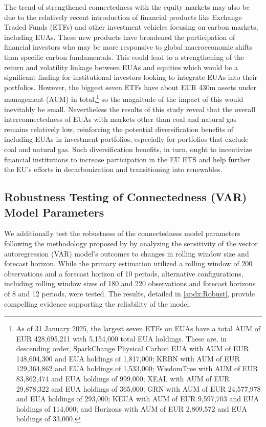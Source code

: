 \documentclass[preprint, 3p,
authoryear]{elsarticle} %
\begin{document}
The trend of strengthened connectedness with the equity markets may also
be due to the relatively recent introduction of financial products like
Exchange Traded Funds (ETFs) and other investment vehicles focusing on
carbon markets, including EUAs. These new products have broadened the
participation of financial investors who may be more responsive to
global macroeconomic shifts than specific carbon fundamentals. This
could lead to a strengthening of the return and volatility linkage
between EUAs and equities which would be a significant finding for
institutional investors looking to integrate EUAs into their portfolios.
However, the biggest seven ETFs have about EUR 430m assets under
management (AUM) in
total,\footnote{As of 31 January 2025, the largest seven ETFs on EUAs have a total AUM of EUR 428,695,211 with 5,154,000 total EUA holdings. These are, in descending order, SparkChange Physical Carbon EUA with AUM of EUR 148,604,300 and EUA holdings of 1,817,000; KRBN with AUM of EUR 129,364,862 and EUA holdings of 1,533,000; WisdomTree with AUM of EUR 83,862,474 and EUA holdings of 999,000; XEAL with AUM of EUR 29,878,322 and EUA holdings of 365,000; GRN with AUM of EUR 24,577,978 and EUA holdings of 293,000; KEUA with AUM of EUR 9,597,703 and EUA holdings of 114,000; and Horizons with AUM of EUR 2,809,572 and EUA holdings of 33,000.}
so the magnitude of the impact of this would inevitably be small.
Nevertheless the results of this study reveal that the overall
interconnectedness of EUAs with markets other than coal and natural gas
remains relatively low, reinforcing the potential diversification
benefits of including EUAs in investment portfolios, especially for
portfolios that exclude coal and natural gas. Such diversification
benefits, in turn, ought to incentivize financial institutions to
increase participation in the EU ETS and help further the EU's efforts
in decarbonization and transitioning into renewables.

\hypertarget{robustness-testing-of-connectedness-var-model-parameters}{%
\subsection{Robustness Testing of Connectedness (VAR) Model
Parameters}\label{robustness-testing-of-connectedness-var-model-parameters}}

We additionally test the robustness of the connectedness model
parameters following the methodology proposed by
\citet{wang_spillover_2023} by analyzing the sensitivity of the vector
autoregression (VAR) model's outcomes to changes in rolling window size
and forecast horizon. While the primary estimation utilized a rolling
window of 200 observations and a forecast horizon of 10 periods,
alternative configurations, including rolling window sizes of 180 and
220 observations and forecast horizons of 8 and 12 periods, were tested.
The results, detailed in \ref{apdx:Robust}, provide compelling evidence
supporting the reliability of the model.
\end{document}
